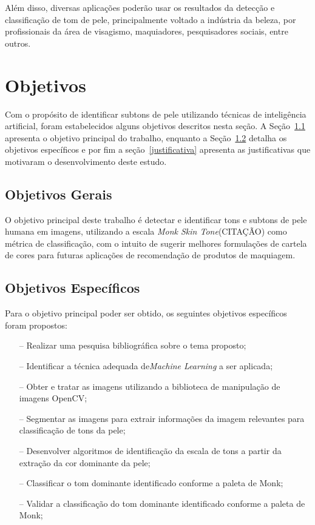 Além disso, diversas aplicações poderão usar os resultados da detecção e classificação de tom de pele, principalmente voltado a indústria da beleza, por profissionais da área de visagismo, maquiadores, pesquisadores sociais, entre outros.

\chapter{Objetivos}
Com o propósito de identificar subtons de pele utilizando técnicas de inteligência artificial, foram estabelecidos alguns objetivos descritos nesta seção. A Seção~\ref{objetivosgerais} apresenta o objetivo principal do trabalho, enquanto a Seção~\ref{objetivosespecificos} detalha os objetivos específicos e por fim a seção~\ref{justificativa} apresenta as justificativas que motivaram o desenvolvimento deste estudo.

\section{Objetivos Gerais}
\label{objetivosgerais}

O objetivo principal deste trabalho é detectar e identificar tons e subtons de pele humana em imagens, utilizando a escala \textit{Monk Skin Tone}(CITAÇÃO) como métrica de classificação, com o intuito de sugerir melhores formulações de cartela de cores para futuras aplicações de recomendação de produtos de maquiagem.
\section{Objetivos Específicos}
\label{objetivosespecificos}

Para o objetivo principal poder ser obtido, os seguintes objetivos específicos foram propostos:

\begin{itemize}
    \item[--] Realizar uma pesquisa bibliográfica sobre o tema proposto;
    \item[--] Identificar a técnica adequada de\textsl{Machine Learning} a ser aplicada;
    \item[--] Obter e tratar as imagens utilizando a biblioteca de manipulação de imagens OpenCV;
    \item[--] Segmentar as imagens para extrair informações da imagem relevantes para classificação de tons da pele; 
    \item[--] Desenvolver algoritmos de identificação da escala de tons a partir da extração da cor dominante da pele;
    \item[--] Classificar o tom dominante identificado conforme a paleta de Monk; 
    \item[--] Validar a classificação do tom dominante identificado conforme a paleta de Monk; 
\end{itemize}